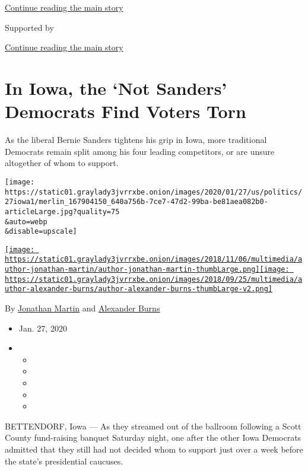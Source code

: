 \protect\hyperlink{after-top}{Continue reading the main story}

Supported by

\protect\hyperlink{after-sponsor}{Continue reading the main story}

\hypertarget{in-iowa-the-not-sanders-democrats-find-voters-torn}{%
\section{In Iowa, the `Not Sanders' Democrats Find Voters
Torn}\label{in-iowa-the-not-sanders-democrats-find-voters-torn}}

As the liberal Bernie Sanders tightens his grip in Iowa, more
traditional Democrats remain split among his four leading competitors,
or are unsure altogether of whom to support.

\texttt{[image: https://static01.graylady3jvrrxbe.onion/images/2020/01/27/us/politics/27iowa1/merlin\_167904150\_640a756b-7ce7-47d2-99ba-be81aea082b0-articleLarge.jpg?quality=75\\\&auto=webp\\\&disable=upscale]}

\href{https://www.nytimes3xbfgragh.onion/by/jonathan-martin}{\texttt{[image: https://static01.graylady3jvrrxbe.onion/images/2018/11/06/multimedia/author-jonathan-martin/author-jonathan-martin-thumbLarge.png]}}\href{https://www.nytimes3xbfgragh.onion/by/alexander-burns}{\texttt{[image: https://static01.graylady3jvrrxbe.onion/images/2018/09/25/multimedia/author-alexander-burns/author-alexander-burns-thumbLarge-v2.png]}}

By \href{https://www.nytimes3xbfgragh.onion/by/jonathan-martin}{Jonathan
Martin} and
\href{https://www.nytimes3xbfgragh.onion/by/alexander-burns}{Alexander
Burns}

\begin{itemize}
\item
  Jan. 27, 2020
\item
  \begin{itemize}
  \item
  \item
  \item
  \item
  \item
  \end{itemize}
\end{itemize}

BETTENDORF, Iowa --- As they streamed out of the ballroom following a
Scott County fund-raising banquet Saturday night, one after the other
Iowa Democrats admitted that they still had not decided whom to support
just over a week before the state's presidential caucuses.


